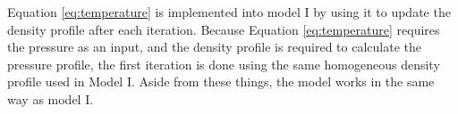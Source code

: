 \documentclass[twocolumn]{article}
\begin{document}
\renewcommand{\arraystretch}{1.5}
\begin{table}[H]
	\caption{The values used to determine the density at each point in the profile.}
	\medskip
	\label{tab:tempeffects}
\end{table}

\noindent Equation \ref{eq:temperature} is implemented into model I by using it to update the density profile after each iteration. Because Equation \ref{eq:temperature} requires the pressure as an input, and the density profile is required to calculate the pressure profile, the first iteration is done using the same homogeneous density profile used in Model I. Aside from these things, the model works in the same way as model I.
\end{document}
